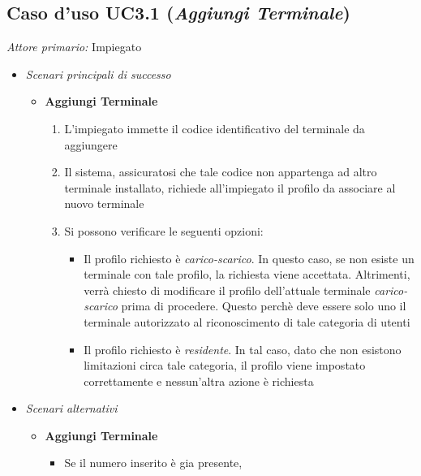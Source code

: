 \documentclass[12pt, letterpaper]{article}
\begin{document}
\subsection{Caso d'uso UC3.1 (\emph{Aggiungi Terminale})}
\emph{Attore primario: } Impiegato

\begin{itemize}
    \item \emph{Scenari principali di successo}
    \begin{itemize}
        \item \textbf{Aggiungi Terminale}
        \begin{enumerate}
            \item L'impiegato immette 
            il codice identificativo del 
            terminale da aggiungere
            \item Il sistema, assicuratosi 
            che tale codice non appartenga 
            ad altro terminale installato, 
            richiede all'impiegato il profilo 
            da associare al nuovo terminale
            \item Si possono verificare le seguenti opzioni:
            \begin{itemize}
                \item Il profilo richiesto è 
                \emph{carico-scarico}. In questo caso, 
                se non esiste un terminale con tale profilo, 
                la richiesta viene accettata. 
                Altrimenti, verrà chiesto di modificare il 
                profilo dell'attuale terminale 
                \emph{carico-scarico} prima di procedere. 
                Questo perchè deve essere solo uno il 
                terminale autorizzato al riconoscimento 
                di tale categoria di utenti
                \item Il profilo richiesto è 
                \emph{residente}. In tal caso, dato che 
                non esistono limitazioni circa tale 
                categoria, il profilo viene impostato 
                correttamente e nessun'altra azione è richiesta
            \end{itemize}
        \end{enumerate}
    \end{itemize}
    \item \emph{Scenari alternativi}
    \begin{itemize}
        \item \textbf{Aggiungi Terminale}
        \begin{itemize}
            \item Se il numero inserito è gia presente, 

\end{itemize}
\end{itemize}
\end{itemize}
\end{document}
